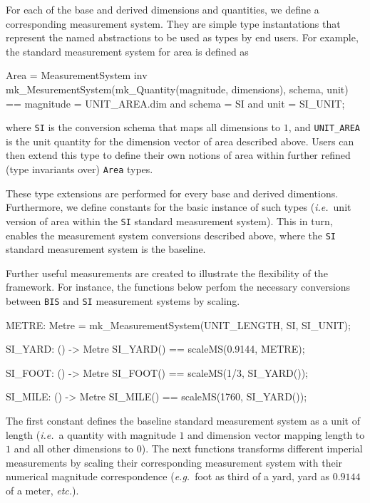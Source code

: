 \documentclass[runningheads,a4paper]{llncs}
\begin{document}
For each of the base and derived dimensions and quantities, we define a corresponding measurement system. They are simple type instantations that represent the named abstractions to be used as types by end users. For example, the standard measurement system for area is defined as 
%
\begin{vdmsl}[frame=none,basicstyle=\ttfamily\scriptsize]
  Area = MeasurementSystem
  inv mk_MesurementSystem(mk_Quantity(magnitude, dimensions), schema, unit) == 
          magnitude = UNIT_AREA.dim and schema = SI and unit = SI_UNIT;
\end{vdmsl}
%
\noindent where \texttt{SI} is the conversion schema that maps all dimensions to \(1\), and \texttt{UNIT\_AREA} is the unit quantity for the dimension vector of area described above. Users can then extend this type to define their own notions of area within further refined (type invariants over) \texttt{Area} types.

These type extensions are performed for every base and derived dimentions. Furthermore, we define constants for the basic instance of such types (\textit{i.e.}~unit version of area within the \texttt{SI} standard measurement system). This in turn, enables the measurement system conversions described above, where the \texttt{SI} standard measurement system is the baseline.   

Further useful measurements are created to illustrate the flexibility of the framework. For instance, the functions below perfom the necessary conversions between \texttt{BIS} and \texttt{SI} measurement systems by scaling.   
%
\begin{vdmsl}[frame=none,basicstyle=\ttfamily\scriptsize]
    METRE: Metre = mk_MeasurementSystem(UNIT_LENGTH, SI, SI_UNIT);

    SI_YARD: () -> Metre
    SI_YARD() == scaleMS(0.9144, METRE);

    SI_FOOT: () -> Metre
    SI_FOOT() == scaleMS(1/3, SI_YARD());

    SI_MILE: () -> Metre
    SI_MILE() == scaleMS(1760, SI_YARD());
\end{vdmsl}
%
\noindent The first constant defines the baseline standard measurement system as a unit of length (\textit{i.e.}~a quantity with magnitude \(1\) and dimension vector mapping length to \(1\) and all other dimensions to \(0\)). The next functions transforms different imperial measurements by scaling their corresponding measurement system with their numerical magnitude correspondence (\textit{e.g.}~foot as third of a yard, yard as \(0.9144\) of a meter, \textit{etc.}). 
\end{document}
